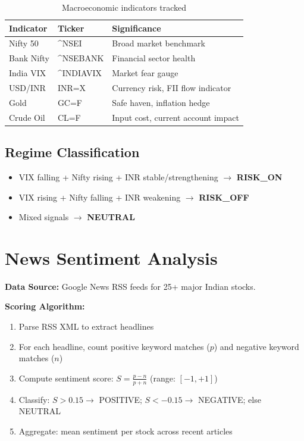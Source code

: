\documentclass[12pt, a4paper, oneside]{report}
\begin{document}
\begin{table}[H]
\centering
\caption{Macroeconomic indicators tracked}
\label{tab:macro_indicators}
\begin{tabularx}{\textwidth}{@{}l l X@{}}
\toprule
\textbf{Indicator} & \textbf{Ticker} & \textbf{Significance} \\
\midrule
Nifty 50 & \textasciicircum NSEI & Broad market benchmark \\
Bank Nifty & \textasciicircum NSEBANK & Financial sector health \\
India VIX & \textasciicircum INDIAVIX & Market fear gauge \\
USD/INR & INR=X & Currency risk, FII flow indicator \\
Gold & GC=F & Safe haven, inflation hedge \\
Crude Oil & CL=F & Input cost, current account impact \\
\bottomrule
\end{tabularx}
\end{table}

\subsection{Regime Classification}

\begin{itemize}[nosep]
    \item VIX falling + Nifty rising + INR stable/strengthening $\to$ \textbf{RISK\_ON}
    \item VIX rising + Nifty falling + INR weakening $\to$ \textbf{RISK\_OFF}
    \item Mixed signals $\to$ \textbf{NEUTRAL}
\end{itemize}

\section{News Sentiment Analysis}
\label{sec:meth_sentiment}

\textbf{Data Source:} Google News RSS feeds for 25+ major Indian stocks.

\textbf{Scoring Algorithm:}
\begin{enumerate}[nosep]
    \item Parse RSS XML to extract headlines
    \item For each headline, count positive keyword matches ($p$) and negative keyword matches ($n$)
    \item Compute sentiment score: $S = \frac{p - n}{p + n}$ (range: $[-1, +1]$)
    \item Classify: $S > 0.15 \to$ POSITIVE; $S < -0.15 \to$ NEGATIVE; else NEUTRAL
    \item Aggregate: mean sentiment per stock across recent articles
\end{enumerate}
\end{document}
